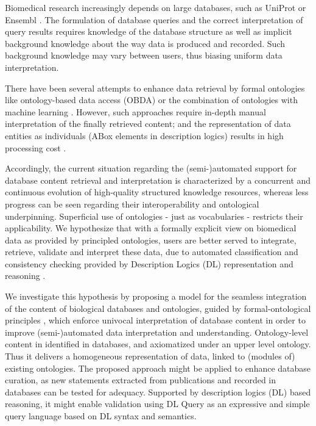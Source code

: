 Biomedical research increasingly depends on large databases, such as UniProt  \citep{UniProtConsortium2014} or Ensembl \citep{Cunningham2014}. The formulation of database queries and the correct interpretation of query results requires knowledge of the database structure as well as implicit background knowledge about the way data is produced and recorded. 
Such background knowledge may vary between users, thus biasing uniform data interpretation. 

There have been several attempts to enhance data retrieval by formal ontologies like ontology-based data access (OBDA) \citep{Poggi2008} or the combination of ontologies with machine learning \citep{Lehmann2009}. However, such approaches require in-depth manual interpretation of the finally retrieved content; and the representation of data entities  as individuals (ABox elements in description logics) results in high processing cost \citep{Hustadt2005}.

Accordingly, the current situation regarding the (semi-)automated support for database content retrieval and interpretation is characterized by a concurrent and continuous evolution of high-quality structured knowledge resources, whereas less progress can be seen regarding their interoperability and ontological underpinning. Superficial use of ontologies - just as vocabularies - restricts their applicability. We hypothesize that with a formally explicit view on biomedical data as provided by principled ontologies, users are better served to integrate, retrieve, validate and interpret these data, due to automated classification and consistency checking provided by Description Logics (DL) representation and reasoning \citep{Baader2007g}. 

We investigate this hypothesis by proposing a model for the seamless integration of the content of biological databases and ontologies, guided by formal-ontological principles \citep{Smith2007}, which enforce univocal interpretation of database content in order to improve (semi-)automated data interpretation and understanding. Ontology-level content in identified in databases, and axiomatized under an upper level ontology. Thus it delivers a homogeneous representation of data, linked to (modules of) existing ontologies.
The proposed approach might be applied to enhance database curation, as new statements extracted from publications and recorded in databases can be tested for adequacy. Supported by description logics (DL) based reasoning, it might enable validation using DL Query as an expressive and simple query language based on DL syntax and semantics. 

